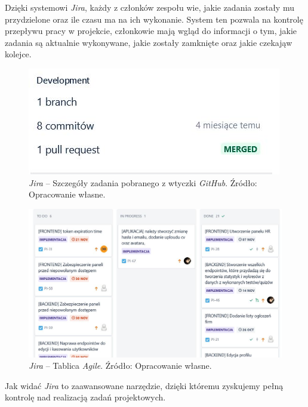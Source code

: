 \documentclass[twoside]{projektInzynierskiMS}
\numberwithin{figure}{section}
\begin{document}
Dzięki systemowi \textit{Jira}, każdy z członków zespołu wie, jakie zadania zostały mu przydzielone oraz ile czasu ma na ich wykonanie. System ten pozwala na kontrolę przepływu pracy w projekcie, członkowie mają wgląd do informacji o tym, jakie zadania są aktualnie wykonywane, jakie zostały zamknięte oraz jakie czekają\linebreak w kolejce.

\begin{figure}[h!]
  \centering
  \includegraphics[scale=1]{images/jira4.JPG}
    \caption{\textit{Jira} -- Szczegóły zadania pobranego z wtyczki \textit{GitHub}. Źródło: Opracowanie własne.}
    \label{fig:jira_task_github}
\end{figure}

\newpage

\begin{figure}[h!]
  \centering
  \includegraphics[scale=0.65]{images/jira2.JPG}
    \caption{\textit{Jira} -- Tablica \textit{Agile}. Źródło: Opracowanie własne.}
    \label{fig:jira_agile}
\end{figure}

Jak widać \textit{Jira} to zaawansowane narzędzie, dzięki któremu zyskujemy pełną kontrolę nad realizacją zadań projektowych.
\end{document}
